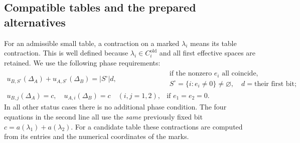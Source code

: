 \subsection{Compatible tables and the prepared alternatives}

For an admissible small table, a contraction on a marked
\(\lambda_i\) means its table contraction.  This is well defined
because \(\lambda_i\in C_i^{\mathrm{old}}\) and all first effective
spaces are retained.  We use the following phase requirements:
\begin{equation}
\begin{array}{ll}
\displaystyle
u_{B,S^\circ}(\Delta_A)+u_{A,S^\circ}(\Delta_B)
       =|S^\circ|d,
&
\begin{gathered}
\text{if the nonzero }e_i\text{ all coincide},\\[-1mm]
S^\circ=\{i:e_i\ne0\}\ne\varnothing,\quad
 d=\text{their first bit};
\end{gathered}
\\[4mm]
u_{B,j}(\Delta_A)=c,\quad u_{A,i}(\Delta_B)=c
\quad(i,j=1,2),
&\text{if }e_1=e_2=0.
\end{array}
\label{eq:phase-compatibility}
\end{equation}
In all other status cases there is no additional phase condition.
The four equations in the second line all use the \emph{same}
previously fixed bit \(c=a(\lambda_1)+a(\lambda_2)\).
For a candidate table these contractions are computed from its
entries and the numerical coordinates of the marks.

